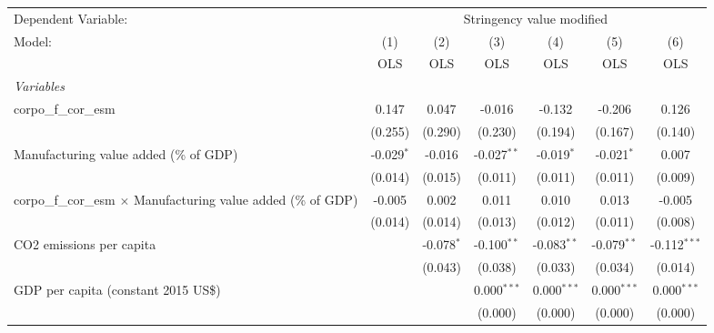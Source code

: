 
\begingroup
\centering
\begin{tabular}{lcccccc}
   \toprule
   Dependent Variable: & \multicolumn{6}{c}{Stringency value modified}\\
   Model:                                                                 & (1)          & (2)          & (3)           & (4)           & (5)           & (6)\\  
                                                                          &  OLS         & OLS          & OLS           & OLS           & OLS           & OLS\\  
   \midrule
   \emph{Variables}\\
   corpo\_f\_cor\_esm                                                     & 0.147        & 0.047        & -0.016        & -0.132        & -0.206        & 0.126\\   
                                                                          & (0.255)      & (0.290)      & (0.230)       & (0.194)       & (0.167)       & (0.140)\\   
   Manufacturing value added (\% of GDP)                                  & -0.029$^{*}$ & -0.016       & -0.027$^{**}$ & -0.019$^{*}$  & -0.021$^{*}$  & 0.007\\   
                                                                          & (0.014)      & (0.015)      & (0.011)       & (0.011)       & (0.011)       & (0.009)\\   
   corpo\_f\_cor\_esm $\times$ Manufacturing value added (\% of GDP)      & -0.005       & 0.002        & 0.011         & 0.010         & 0.013         & -0.005\\   
                                                                          & (0.014)      & (0.014)      & (0.013)       & (0.012)       & (0.011)       & (0.008)\\   
   CO2 emissions per capita                                               &              & -0.078$^{*}$ & -0.100$^{**}$ & -0.083$^{**}$ & -0.079$^{**}$ & -0.112$^{***}$\\   
                                                                          &              & (0.043)      & (0.038)       & (0.033)       & (0.034)       & (0.014)\\   
   GDP per capita (constant 2015 US\$)                                    &              &              & 0.000$^{***}$ & 0.000$^{***}$ & 0.000$^{***}$ & 0.000$^{***}$\\   
                                                                          &              &              & (0.000)       & (0.000)       & (0.000)       & (0.000)\\   

\end{tabular}
